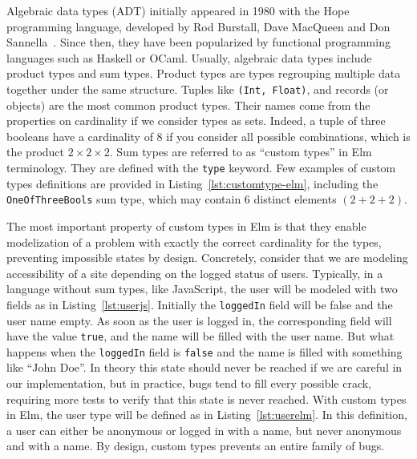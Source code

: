 Algebraic data types (ADT) initially appeared in 1980 with the Hope programming language,
developed by Rod Burstall, Dave MacQueen and Don Sannella~\cite{burstall1980hope}.
Since then, they have been popularized by functional programming languages
such as Haskell or OCaml.
Usually, algebraic data types include product types and sum types.
Product types are types regrouping multiple data together under the same structure.
Tuples like \verb|(Int, Float)|, and records (or objects) are the most common product types.
Their names come from the properties on cardinality if we consider types as sets.
Indeed, a tuple of three booleans have a cardinality of 8 if you consider
all possible combinations, which is the product $2\times2\times2$.
Sum types are referred to as ``custom types'' in Elm terminology.
They are defined with the \verb|type| keyword.
Few examples of custom types definitions are provided in Listing~\ref{lst:customtype-elm},
including the \verb|OneOfThreeBools| sum type,
which may contain 6 distinct elements $(2 + 2 + 2)$.



The most important property of custom types in Elm
is that they enable modelization of a problem with exactly the correct
cardinality for the types, preventing impossible states by design.
Concretely, consider that we are modeling accessibility of a site
depending on the logged status of users.
Typically, in a language without sum types, like JavaScript,
the user will be modeled with two fields as in Listing~\ref{lst:userjs}.
Initially the \verb|loggedIn| field will be false and the user name empty.
As soon as the user is logged in,
the corresponding field will have the value \verb|true|,
and the name will be filled with the user name.
But what happens when the \verb|loggedIn| field is \verb|false| and
the name is filled with something like ``John Doe''.
In theory this state should never be reached if we are careful in our implementation,
but in practice, bugs tend to fill every possible crack,
requiring more tests to verify that this state is never reached.
With custom types in Elm, the user type will be defined as in Listing~\ref{lst:userelm}.
In this definition, a user can either be anonymous or logged in with a name,
but never anonymous and with a name.
By design, custom types prevents an entire family of bugs.



